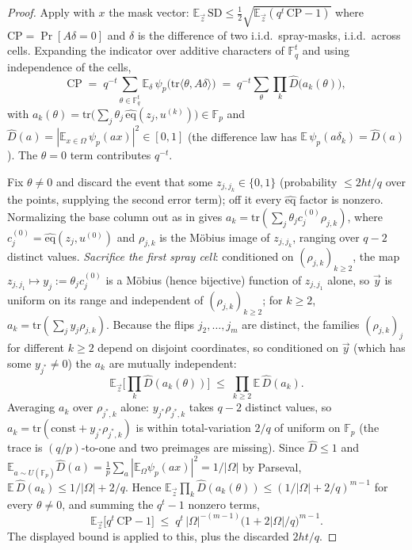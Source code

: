 \documentclass{article}
\newcommand{\Fp}{\mathbb{F}_p}
\newcommand{\Fq}{\mathbb{F}_q}
\newcommand{\eqf}{\widehat{\mathrm{eq}}}
\theoremstyle{definition}
\begin{document}
\begin{proof}
Apply  with $x$ the mask vector: $\mathbb{E}_{\vec z}\,\mathrm{SD} \leq \tfrac12\sqrt{\mathbb{E}_{\vec z}(q^t\,\mathrm{CP} - 1)}$ where $\mathrm{CP} = \Pr[A\delta = 0]$ and $\delta$ is the difference of two i.i.d.\ spray-masks, i.i.d.\ across cells. Expanding the indicator over additive characters of $\Fq^t$ and using independence of the cells,
\[
\mathrm{CP} \;=\; q^{-t}\sum_{\theta \in \Fq^t} \mathbb{E}_\delta\,\psi_p\big(\mathrm{tr}\langle\theta, A\delta\rangle\big) \;=\; q^{-t}\sum_{\theta} \prod_k \hat D\big(a_k(\theta)\big) ,
\]
with $a_k(\theta) = \mathrm{tr}\big(\sum_j \theta_j\, \eqf(z_j, u^{(k)})\big) \in \Fp$ and $\hat D(a) = |\mathbb{E}_{x\in\Omega}\,\psi_p(ax)|^2 \in [0,1]$ (the difference law has $\mathbb{E}\,\psi_p(a\delta_k) = \hat D(a)$). The $\theta = 0$ term contributes $q^{-t}$.

Fix $\theta \neq 0$ and discard the event that some $z_{j, j_k} \in \{0,1\}$ (probability $\leq 2ht/q$ over the points, supplying the second error term); off it every $\eqf$ factor is nonzero. Normalizing the base column out as in  gives $a_k = \mathrm{tr}(\sum_j \theta_j c_j^{(0)} \rho_{j,k})$, where $c_j^{(0)} = \eqf(z_j, u^{(0)})$ and $\rho_{j,k}$ is the M\"obius image of $z_{j,j_k}$, ranging over $q - 2$ distinct values. \emph{Sacrifice the first spray cell}: conditioned on $(\rho_{j,k})_{k \geq 2}$, the map $z_{j,j_1} \mapsto y_j := \theta_j c_j^{(0)}$ is a M\"obius (hence bijective) function of $z_{j,j_1}$ alone, so $\vec y$ is uniform on its range and independent of $(\rho_{j,k})_{k\geq2}$; for $k \geq 2$, $a_k = \mathrm{tr}(\sum_j y_j \rho_{j,k})$. Because the flips $j_2, \dots, j_m$ are distinct, the families $(\rho_{j,k})_j$ for different $k \geq 2$ depend on disjoint coordinates, so conditioned on $\vec y$ (which has some $y_{j^*} \neq 0$) the $a_k$ are mutually independent:
\[
\mathbb{E}_{\vec z}\Big[\textstyle\prod_k \hat D(a_k(\theta))\Big] \;\leq\; \prod_{k \geq 2}\mathbb{E}\,\hat D(a_k) .
\]
Averaging $a_k$ over $\rho_{j^*,k}$ alone: $y_{j^*}\rho_{j^*,k}$ takes $q-2$ distinct values, so $a_k = \mathrm{tr}(\mathrm{const} + y_{j^*}\rho_{j^*,k})$ is within total-variation $2/q$ of uniform on $\Fp$ (the trace is $(q/p)$-to-one and two preimages are missing). Since $\hat D \leq 1$ and $\mathbb{E}_{a\sim U(\Fp)}\hat D(a) = \tfrac1p\sum_a|\mathbb{E}_\Omega \psi_p(ax)|^2 = 1/|\Omega|$ by Parseval, $\mathbb{E}\,\hat D(a_k) \leq 1/|\Omega| + 2/q$. Hence $\mathbb{E}_{\vec z}\prod_k \hat D(a_k(\theta)) \leq (1/|\Omega| + 2/q)^{m-1}$ for every $\theta \neq 0$, and summing the $q^t - 1$ nonzero terms,
\[
\mathbb{E}_{\vec z}\big[q^t\,\mathrm{CP} - 1\big] \;\leq\; q^t\,|\Omega|^{-(m-1)}\big(1 + 2|\Omega|/q\big)^{m-1} .
\]
The displayed bound is  applied to this, plus the discarded $2ht/q$.
\end{proof}
\end{document}
